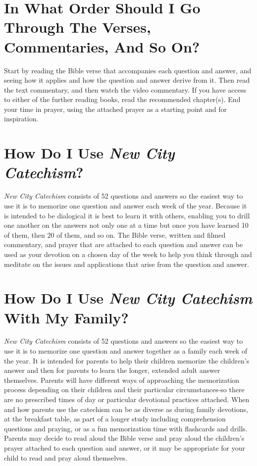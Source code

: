 \section[In What Order Should I Go Through The Verses, Commentaries, And So On?][Additional Resources]{In What Order Should I Go Through The Verses, Commentaries, And So On?}

Start by reading the Bible verse that accompanies each question and answer, and seeing how it applies and how the question and answer derive from it. Then read the text commentary, and then watch the video commentary. If you have access to either of the further reading books, read the recommended chapter(s). End your time in prayer, using the attached prayer as a starting point and for inspiration.

\section[How Do I Use {\em New City Catechism}?][Using the {\em Catechism}]{How Do I Use {\em New City Catechism}?}

\emph{New City Catechism}\/ consists of 52 questions and answers so the easiest way to use it is to memorize one question and answer each week of the year. Because it is intended to be dialogical it is best to learn it with others, enabling you to drill one another on the answers not only one at a time but once you have learned 10 of them, then 20 of them, and so on. The Bible verse, written and filmed commentary, and prayer that are attached to each question and answer can be used as your devotion on a chosen day of the week to help you think through and meditate on the issues and applications that arise from the question and answer.

\section[How Do I Use {\em New City Catechism}\/ With My Family?][{\em New City Catechism}\/ With A Family]{How Do I Use {\em New City Catechism}\/ With My Family?}

\emph{New City Catechism}\/ consists of 52 questions and answers so the easiest way to use it is to memorize one question and answer together as a family each week of the year. It is intended for parents to help their children memorize the children's answer and then for parents to learn the longer, extended adult answer themselves. Parents will have different ways of approaching the memorization process depending on their children and their particular circumstances-so there are no prescribed times of day or particular devotional practices attached. When and how parents use the catechism can be as diverse as during family devotions, at the breakfast table, as part of a longer study including comprehension questions and praying, or as a fun memorization time with flashcards and drills. Parents may decide to read aloud the Bible verse and pray aloud the children's prayer attached to each question and answer, or it may be appropriate for your child to read and pray aloud themselves.

